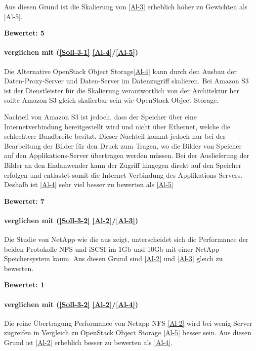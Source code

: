 Aus diesen Grund ist die Skalierung von  \ref{Al-3} erheblich höher zu Gewichten als  \ref{Al-5}.

\textbf{Bewertet: 5}


\paragraph*{  verglichen mit  (\ref{Soll-3-1} \ref{Al-4}/\ref{Al-5})}
Die Alternative OpenStack Object Storage\ref{Al-4} kann durch den Ausbau der Daten-Proxy-Server und Daten-Server im Datenzugriff skalieren. Bei Amazon S3 ist der Dienstleister für die Skalierung verantwortlich von der Architektur her sollte Amazon S3 gleich skalierbar sein wie OpenStack Object Storage.

Nachteil von Amazon S3 ist jedoch, dass der Speicher über eine Internetverbindung bereitgestellt wird und nicht über Ethernet, welche die schlechtere Bandbreite besitzt. Dieser Nachteil kommt jedoch nur bei der Bearbeitung der Bilder für den Druck zum Tragen, wo die Bilder von Speicher auf den Applikations-Server übertragen werden müssen. Bei der Auslieferung der Bilder an den Endanwender kann der Zugriff hingegen direkt auf den Speicher erfolgen und entlastet somit die Internet Verbindung des Applikations-Servers.
Deshalb ist  \ref{Al-4} sehr viel besser zu bewerten als  \ref{Al-5}

\textbf{Bewertet: 7}


\paragraph*{  verglichen mit  (\ref{Soll-3-2} \ref{Al-2}/\ref{Al-3})}
Die Studie von NetApp wie die  aus  zeigt, unterscheidet sich die Performance der beiden Protokolle NFS und iSCSI im 1Gb und 10Gb mit einer NetApp Speichersystem kaum. Aus diesen Grund sind \ref{Al-2} und \ref{Al-3} gleich zu bewerten.

\textbf{Bewertet: 1}

\paragraph*{  verglichen mit  (\ref{Soll-3-2} \ref{Al-2}/\ref{Al-4})}
Die reine Übertragung Performance von Netapp NFS \ref{Al-2} wird bei wenig Server zugreifen in Vergleich zu OpenStack Object Storage \ref{Al-5} besser sein. Aus diesen Grund ist \ref{Al-2} erheblich besser zu bewerten als \ref{Al-4}.
 
